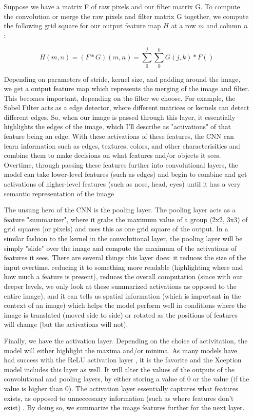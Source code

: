 \documentclass[10pt,twocolumn]{article}
\begin{document}
Suppose we have a matrix F of raw pixels and our filter matrix G. To compute the convolution or merge the raw pixels and filter matrix G together, we compute the following grid square for our output feature map $H$ at a row $m$ and column $n$:

\[ H(m, n)  =  (F * G)(m, n) = \sum_{0}^{j} \sum_{0}^{k} G(j, k) * F() \]

Depending on parameters of stride, kernel size, and padding around the image, we get a output feature map which represents the merging of the image and filter. This becomes important, depending on the filter we choose. For example, the Sobel Filter \cite{} acts as a edge detector, where different matrices or kernels can detect different edges. So, when our image is passed through this layer, it essentially highlights the edges of the image, which I'll describe as "activations" of that feature being an edge. With these activations of these features, the CNN can learn information such as edges, textures, colors, and other characterisitics and combine them to make decisions on what features and/or objects it sees. Overtime, through passing these features further into convolutional layers, the model can take lower-level features (such as edges) and begin to combine and get activations of higher-level features (such as nose, head, eyes) until it has a very semantic representation of the image

The unsung hero of the CNN is the pooling layer. The pooling layer acts as a feature "summarizer", where it grabs the maximum value of a group (2x2, 3x3) of grid squares (or pixels) and uses this as one grid square of the output. In a similar fashion to the kernel in the convolutional layer, the pooling layer will be simply "slide" over the image and compute the maximum of the activations of features it sees. There are several things this layer does: it reduces the size of the input overtime, reducing it to something more readable (highlighting where and how much a feature is present), reduces the overall computation (since with our deeper levels, we only look at these summarized activations as opposed to the entire image), and it can tells us spatial information (which is important in the context of an image) which helps the model perform well in conditions where the image is translated (moved side to side) or rotated as the positions of features will change (but the activations will not).

Finally, we have the activation layer. Depending on the choice of activitation, the model will either highlight the maxima and/or minima. As many models have had success with the ReLU activation layer \cite{}, it is the favorite and the Xception model includes this layer as well. It will alter the values of the outputs of the convolutional and pooling layers, by either storing a value of 0 or the value (if the value is higher than 0). The activation layer essentially captures what features exists, as opposed to unneccesaary information (such as where features don't exist) \cite{}. By doing so, we summarize the image features further for the next layer.
\end{document}
